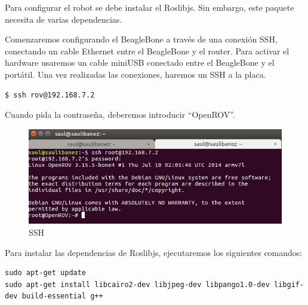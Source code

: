 Para configurar el robot se debe instalar el Roslibjs. Sin embargo, este paquete necesita de varias dependencias.

Comenzaremos configurando el BeagleBone a través de una conexión SSH, conectando un cable Ethernet entre el BeagleBone y el router.
Para activar el hardware usaremos un cable miniUSB conectado entre el BeagleBone y el portátil.
Una vez realizadas las conexiones, haremos un SSH a la placa.
\renewcommand{\lstlistingname}{}
\begin{lstlisting}[caption=SSH, label={lst:ssh}]
$ ssh rov@192.168.7.2
\end{lstlisting}
Cuando pida la contraseña, deberemos introducir “OpenROV”.

\begin{figure} [hbtp]
  \begin{center}
    \includegraphics[width=12cm]{img/cap4/ssh}
  \end{center}
  \caption{SSH}
  \label{fig:ssh}
\end{figure}

Para instalar las dependencias de Roslibjs, ejecutaremos los siguientes comandos:

\renewcommand{\lstlistingname}{}
\begin{lstlisting}[caption=Dependencias Roslibjs, label={lst:roslibjs}]
sudo apt-get update 
sudo apt-get install libcairo2-dev libjpeg-dev libpango1.0-dev libgif-dev build-essential g++
\end{lstlisting}

